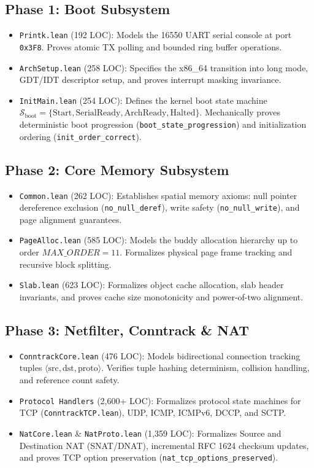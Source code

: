 \documentclass[10pt,twocolumn,letterpaper]{article}
\theoremstyle{definition}
\begin{document}
\subsection{Phase 1: Boot Subsystem}
\begin{itemize}
    \item \texttt{Printk.lean} (192 LOC): Models the 16550 UART serial console at port \texttt{0x3F8}. Proves atomic TX polling and bounded ring buffer operations.
    \item \texttt{ArchSetup.lean} (258 LOC): Specifies the x86\_64 transition into long mode, GDT/IDT descriptor setup, and proves interrupt masking invariance.
    \item \texttt{InitMain.lean} (254 LOC): Defines the kernel boot state machine $\mathcal{S}_{\text{boot}} = \{\text{Start}, \text{SerialReady}, \text{ArchReady}, \text{Halted}\}$. Mechanically proves deterministic boot progression (\texttt{boot\_state\_progression}) and initialization ordering (\texttt{init\_order\_correct}).
\end{itemize}

\subsection{Phase 2: Core Memory Subsystem}
\begin{itemize}
    \item \texttt{Common.lean} (262 LOC): Establishes spatial memory axioms: null pointer dereference exclusion (\texttt{no\_null\_deref}), write safety (\texttt{no\_null\_write}), and page alignment guarantees.
    \item \texttt{PageAlloc.lean} (585 LOC): Models the buddy allocation hierarchy up to order $MAX\_ORDER = 11$. Formalizes physical page frame tracking and recursive block splitting.
    \item \texttt{Slab.lean} (623 LOC): Formalizes object cache allocation, slab header invariants, and proves cache size monotonicity and power-of-two alignment.
\end{itemize}

\subsection{Phase 3: Netfilter, Conntrack \& NAT}
\begin{itemize}
    \item \texttt{ConntrackCore.lean} (476 LOC): Models bidirectional connection tracking tuples $\langle \text{src}, \text{dst}, \text{proto} \rangle$. Verifies tuple hashing determinism, collision handling, and reference count safety.
    \item \texttt{Protocol Handlers} (2,600+ LOC): Formalizes protocol state machines for TCP (\texttt{ConntrackTCP.lean}), UDP, ICMP, ICMPv6, DCCP, and SCTP.
    \item \texttt{NatCore.lean} \& \texttt{NatProto.lean} (1,359 LOC): Formalizes Source and Destination NAT (SNAT/DNAT), incremental RFC 1624 checksum updates, and proves TCP option preservation (\texttt{nat\_tcp\_options\_preserved}).
\end{itemize}
\end{document}
